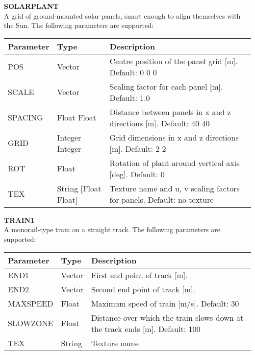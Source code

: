 \documentclass[Orbiter Developer Manual.tex]{subfiles}
\begin{document}
\noindent
\textbf{SOLARPLANT}\\
A grid of ground-mounted solar panels, smart enough to align themselves with the Sun. The following parameters are supported:

	\begin{longtable}{ |p{}|p{}|p{}| }
	\hline\rule{0pt}{2ex}
	\textbf{Parameter} & \textbf{Type} & \textbf{Description}\\
	\hline\rule{0pt}{2ex}
	POS & Vector & Centre position of the panel grid [m]. Default: 0 0 0\\
	\hline\rule{0pt}{2ex}
	SCALE & Vector & Scaling factor for each panel [m]. Default: 1.0\\
	\hline\rule{0pt}{2ex}
	SPACING & Float Float & Distance between panels in x and z directions [m]. Default: 40 40\\
	\hline\rule{0pt}{2ex}
	GRID & Integer Integer & Grid dimensions in x and z directions [m]. Default: 2 2\\
	\hline\rule{0pt}{2ex}
	ROT & Float & Rotation of plant around vertical axis [deg]. Default: 0\\
	\hline\rule{0pt}{2ex}
	TEX & String [Float Float] & Texture name and u, v scaling factors for panels. Default: no texture\\
	\hline
	\end{longtable}

\noindent
\textbf{TRAIN1}\\
A monorail-type train on a straight track. The following parameters are supported:

	\begin{longtable}{ |p{}|p{}|p{}| }
	\hline\rule{0pt}{2ex}
	\textbf{Parameter} & \textbf{Type} & \textbf{Description}\\
	\hline\rule{0pt}{2ex}
	END1 & Vector & First end point of track [m].\\
	\hline\rule{0pt}{2ex}
	END2 & Vector & Second end point of track [m].\\
	\hline\rule{0pt}{2ex}
	MAXSPEED & Float & Maximum speed of train [m/s]. Default: 30\\
	\hline\rule{0pt}{2ex}
	SLOWZONE & Float & Distance over which the train slows down at the track ends [m]. Default: 100\\
	\hline\rule{0pt}{2ex}
	TEX & String & Texture name\\
	\hline
	\end{longtable}
\end{document}
